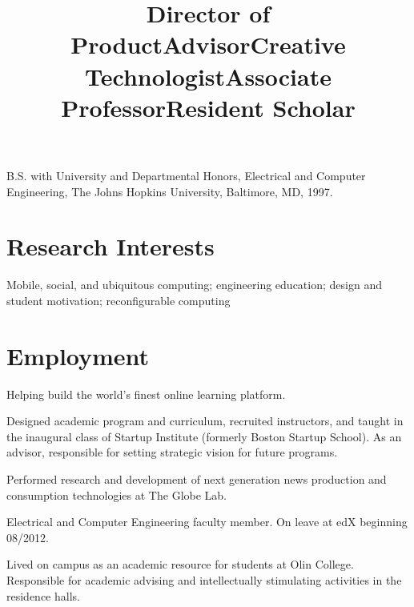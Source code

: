 \documentclass[line]{res}
\begin{document}
\begin{resume}
	B.S. with University and Departmental Honors, Electrical and Computer Engineering, The Johns Hopkins University, Baltimore, MD, 1997.
	
	\section{\sc Research Interests}
	
	Mobile, social, and ubiquitous computing; engineering education; design and student motivation; reconfigurable computing
	
	\section{\sc Employment}

	\title{Director of Product} 
	 
	\begin{position}
		Helping build the world's finest online learning platform.
	\end{position}
	
	\title{Advisor} 
	 
	\begin{position}
		Designed academic program and curriculum, recruited instructors, and taught in the inaugural class of Startup Institute (formerly Boston Startup School). As an advisor, responsible for setting strategic vision for future programs.
	\end{position}
	
	\title{Creative Technologist} 
	  
	\begin{position}
		Performed research and development of next generation news production and consumption
    technologies at The Globe Lab.
	\end{position}
	
	\title{Associate Professor} 
	  
	\begin{position}
		Electrical and Computer Engineering faculty member. On leave at edX beginning 08/2012.
	\end{position}
	
	\title{Resident Scholar} 
	  
	\begin{position}
		Lived on campus as an academic resource for students at Olin College. Responsible for academic advising and intellectually stimulating activities in the residence halls.
	\end{position}
	

\end{resume}
\end{document}

